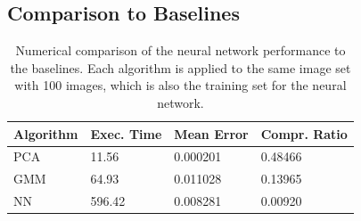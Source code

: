 








\subsection{Comparison to Baselines}

\begin{table}
\centering
    \begin{tabular}{| l | l | l | l |}
    \hline
    Algorithm & Exec. Time & Mean Error & Compr. Ratio \\ \hline
    PCA & 11.56 & 0.000201 & 0.48466\\ \hline
    GMM & 64.93 & 0.011028 & 0.13965 \\ \hline
    NN & 596.42 & 0.008281 & 0.00920 \\
    \hline
    \end{tabular}
    \caption{Numerical comparison of the neural network performance to the baselines. Each algorithm is applied to the same image set with 100 images, which is also the training set for the neural network.}
    \label{tab:compareBaselines}
\end{table}

